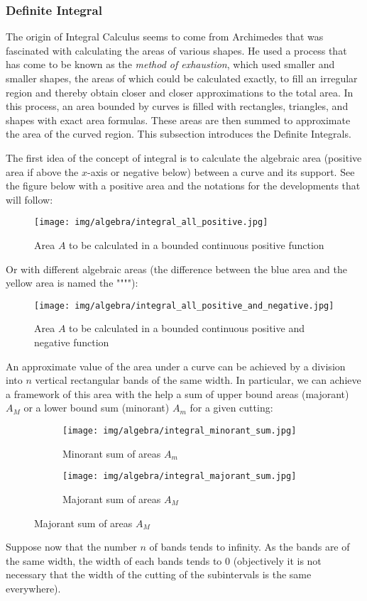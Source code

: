		 \subsubsection{Definite Integral}\label{definite integral}
		 The origin of Integral Calculus seems to come from Archimedes that was fascinated with calculating the areas of various shapes. He used a process that has come to be known as the \textit{method of exhaustion}, which used smaller and smaller shapes, the areas of which could be calculated exactly, to fill an irregular region and thereby obtain closer and closer approximations to the total area. In this process, an area bounded by curves is filled with rectangles, triangles, and shapes with exact area formulas. These areas are then summed to approximate the area of the curved region. This subsection introduces the Definite Integrals.
		 		 
		 The first idea of the concept of integral is to calculate the algebraic area (positive area if above the $x$-axis or negative below) between a curve and its support. See the figure below with a positive area and the notations for the developments that will follow:
		 \begin{figure}[H]
			\centering
			\texttt{[image: img/algebra/integral\_all\_positive.jpg]}
			\caption[]{Area $A$ to be calculated in a bounded continuous positive function}
		\end{figure}
		Or with different algebraic areas (the difference between the blue area and the yellow area is named the """"):
		 \begin{figure}[H]
			\centering
			\texttt{[image: img/algebra/integral\_all\_positive\_and\_negative.jpg]}
			\caption[]{Area $A$ to be calculated in a bounded continuous positive and negative function}
		\end{figure}
		An approximate value of the area under a curve can be achieved by a division into $n$ vertical rectangular bands of the same width. In particular, we can achieve a framework of this area with the help a sum of upper bound areas (majorant) $A_M$ or a lower bound sum (minorant) $A_m$ for a given cutting:
		\begin{figure}[H]
			\centering
			\begin{subfigure}{0.4\textwidth}
				\texttt{[image: img/algebra/integral\_minorant\_sum.jpg]}
				\caption{Minorant sum of areas $A_m$}
			\end{subfigure}
			\begin{subfigure}{0.4\textwidth}
				\texttt{[image: img/algebra/integral\_majorant\_sum.jpg]}
				\caption{Majorant sum of areas $A_M$}
			\end{subfigure}				
		\end{figure}
		Suppose now that the number $n$ of bands tends to infinity. As the bands are of the same width, the width of each bands tends to $0$ (objectively it is not necessary that the width of the cutting of the subintervals is the same everywhere).
		
